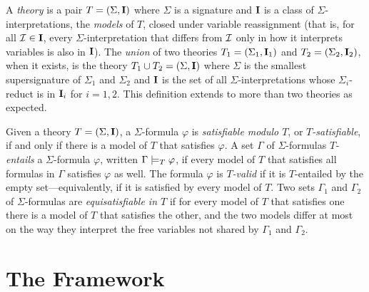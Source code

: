 \documentclass{svjour3}                     %
\begin{document}
A \emph{theory} is a pair $T = (\Sigma, \Mo)$ where
$\Sigma$ is a signature and $\Mo$ is a class of $\Sigma$-interpretations,
the \emph{models} of $T$, closed under variable reassignment
(that is, for all $\I \in \Mo$, every $\Sigma$-interpretation that differs
from $\I$ only in how it interprets variables is also in $\Mo$).
%
The \emph{union} of two theories $T_1 = (\Sigma_1, \Mo_1)$ and $T_2 = (\Sigma_2, \Mo_2)$,
when it exists,
is the theory $T_1 \cup T_2 = (\Sigma, \Mo)$
where $\Sigma$ is the smallest supersignature of $\Sigma_1$ and $\Sigma_2$
and $\Mo$ is the set of all $\Sigma$-interpretations whose $\Sigma_i$-reduct
is in $\Mo_i$ for $i=1,2$.
This definition extends to more than two theories as expected.

Given a theory $T = (\Sigma, \Mo)$, 
a $\Sigma$-formula $\varphi$ is \emph{satisfiable modulo $T$}, or \emph{$T$-satisfiable},
if and only if there is a model of $T$ that satisfies $\varphi$.
A set $\Gamma$ of $\Sigma$-formulas \emph{$T$-entails} a $\Sigma$-formula $\varphi$,
written $\Gamma \ent[T] \varphi$,
if every model of $T$ that satisfies all formulas in $\Gamma$ satisfies $\varphi$ as well.
The formula $\varphi$ is \emph{$T$-valid} if it is $T$-entailed by the empty set---equivalently,
if it is satisfied by every model of $T$.
Two sets $\Gamma_1$ and $\Gamma_2$ of $\Sigma$-formulas are \emph{equisatisfiable in $T$}
if for every model of $T$ that satisfies one there is a model of $T$ that satisfies the other,
and the two models differ at most on the way they interpret the free variables
not shared by $\Gamma_1$ and $\Gamma_2$.
%


\section{The \dpllts Framework}
\label{sec:dpllts}
\end{document}
